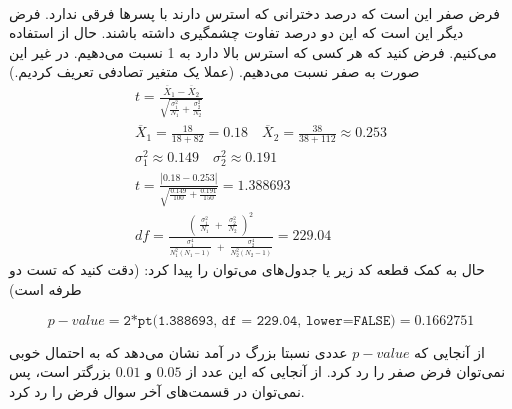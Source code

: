 \\
فرض صفر این است که درصد دخترانی که استرس دارند با پسر‌ها فرقی ندارد.
فرض دیگر این است که این دو درصد تفاوت چشمگیری داشته باشند.
حال از
استفاده می‌کنیم. فرض کنید که هر کسی که استرس بالا دارد به 1 نسبت می‌دهیم. در غیر این صورت به صفر نسبت می‌دهیم.
(عملا یک متغیر تصادفی تعریف کردیم.)
\begin{gather*}
    t = \frac{\overline{X}_1 - \overline{X}_2}{\sqrt{\frac{\sigma_1^2}{N_1} + \frac{\sigma_2^2}{N_2}}}\\
    \overline{X}_1 = \frac{18}{18 + 82} = 0.18  \quad \overline{X}_2 = \frac{38}{38 + 112} \approx 0.253\\
    \sigma_1^2 \approx 0.149 \quad \sigma_2^2 \approx 0.191\\
    t = \frac{|0.18 - 0.253|}{\sqrt{\frac{0.149}{100} + \frac{0.191}{150}}} = 1.388693\\
    df = \frac{\left( \; \frac{\sigma_1^2}{N_1} \; + \; \frac{\sigma_2^2}{N_2} \; \right)^2 }
    { \frac{\sigma_1^4}{N_1^2 (N_1 - 1)} \; + \; \frac{\sigma_2^4}{N_2^2 (N_2 - 1) }} = 229.04
\end{gather*}
حال به کمک قطعه کد زیر یا جدول‌های
می‌توان
را پیدا کرد: (دقت کنید که تست دو طرفه است)
\begin{latin}
\[ %
    p-value = \texttt{2*pt(1.388693, df = 229.04, lower=FALSE)} = 0.1662751
\]
\end{latin}
\noindent
از آنجایی که
$p-value$
عددی نسبتا بزرگ در آمد نشان می‌دهد که به احتمال خوبی نمی‌توان فرض صفر را رد کرد. از آنجایی که این عدد از
$0.05$ و $0.01$
بزرگتر است، پس نمی‌توان در قسمت‌های آخر سوال فرض را رد کرد.




